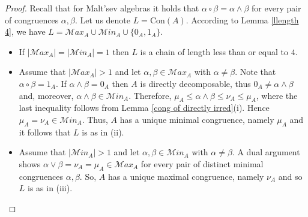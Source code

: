 \documentclass[a4paper, english, 9pt]{amsart}
\theoremstyle{plain}
\newtheorem{lemma}[theorem]{Lemma}
\theoremstyle{definition}
\def\con{\mathrm{Con}}
\def\Ma{\mathcal Max}
\def\ma{\mathcal Min}
\begin{document}
\begin{proof}
Recall that for Malt'sev algebras it holds that $\alpha\circ\beta=\alpha\wedge\beta$ for every pair of congruences $\alpha,\beta$. Let us denote $L=\con(A)$. According to Lemma \ref{llength 4}, we have $L=\Ma_A\cup \ma_A\cup \{0_A,1_A\}$. 
\begin{itemize}
    \item  If $|\Ma_A|=|\ma_A|=1$ then $L$ is a chain of length less than or equal to $4$. 

\item Assume that $|\Ma_A|>1$ and let $\alpha,\beta\in\Ma_A$ with $\alpha\neq \beta$. Note that $\alpha\circ \beta=1_A$. If $\alpha\wedge\beta=0_A$ then $A$ is directly decomposable, thus $0_A\neq \alpha\wedge\beta$ and, moreover, $\alpha\wedge\beta\in \ma_A$. Therefore, $\mu_A\leq \alpha\wedge\beta \leq \nu_A\leq \mu_A$, where the last inequality follows from Lemma \ref{cong of directly irred}(i). Hence $\mu_A=\nu_A\in \ma_A$. Thus, $A$ has a unique minimal congruence, namely $\mu_A$ and it follows that $L$ is as in (ii).

\item Assume that $|\ma_A|>1$ and let $\alpha,\beta\in \ma_A$ with $\alpha\neq \beta$. A dual argument shows $\alpha\vee\beta=\nu_A=\mu_A\in \Ma_A$ for every pair of distinct minimal congruences $\alpha,\beta$. So, $A$ has a unique maximal congruence, namely $\nu_A$ and so $L$ is as in (iii).\qedhere
\end{itemize}

%
%
\end{proof}






\end{document}
